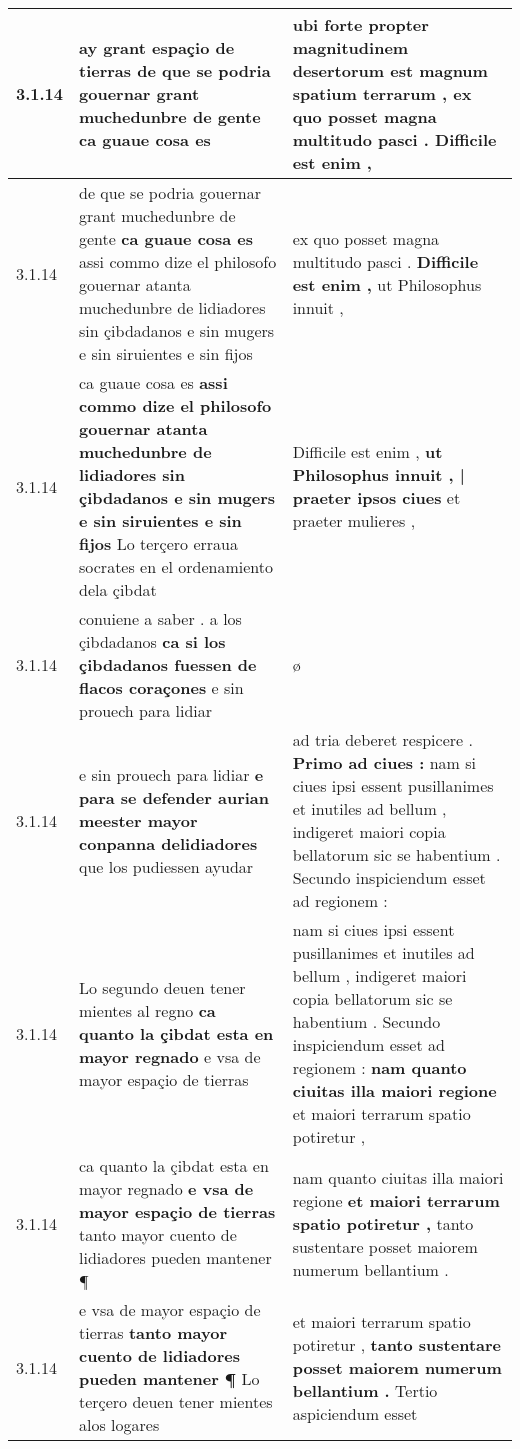 \begin{tabular}{|p{1cm}|p{6.5cm}|p{6.5cm}|}
3.1.14 & ay grant espaçio de tierras \textbf{ de que se podria gouernar grant muchedunbre de gente } ca guaue cosa es & ubi forte propter magnitudinem desertorum est magnum spatium terrarum , \textbf{ ex quo posset magna multitudo pasci . } Difficile est enim , \\\hline
3.1.14 & de que se podria gouernar grant muchedunbre de gente \textbf{ ca guaue cosa es } assi commo dize el philosofo gouernar atanta muchedunbre de lidiadores sin çibdadanos e sin mugers e sin siruientes e sin fijos & ex quo posset magna multitudo pasci . \textbf{ Difficile est enim , } ut Philosophus innuit , \\\hline
3.1.14 & ca guaue cosa es \textbf{ assi commo dize el philosofo gouernar atanta muchedunbre de lidiadores sin çibdadanos e sin mugers e sin siruientes e sin fijos } Lo terçero erraua socrates en el ordenamiento dela çibdat & Difficile est enim , \textbf{ ut Philosophus innuit , | praeter ipsos ciues } et praeter mulieres , \\\hline
3.1.14 & conuiene a saber . a los çibdadanos \textbf{ ca si los çibdadanos fuessen de flacos coraçones } e sin prouech para lidiar & ø \\\hline
3.1.14 & e sin prouech para lidiar \textbf{ e para se defender aurian meester mayor conpanna delidiadores } que los pudiessen ayudar & ad tria deberet respicere . \textbf{ Primo ad ciues : } nam si ciues ipsi essent pusillanimes et inutiles ad bellum , indigeret maiori copia bellatorum sic se habentium . Secundo inspiciendum esset ad regionem : \\\hline
3.1.14 & Lo segundo deuen tener mientes al regno \textbf{ ca quanto la çibdat esta en mayor regnado } e vsa de mayor espaçio de tierras & nam si ciues ipsi essent pusillanimes et inutiles ad bellum , indigeret maiori copia bellatorum sic se habentium . Secundo inspiciendum esset ad regionem : \textbf{ nam quanto ciuitas illa maiori regione } et maiori terrarum spatio potiretur , \\\hline
3.1.14 & ca quanto la çibdat esta en mayor regnado \textbf{ e vsa de mayor espaçio de tierras } tanto mayor cuento de lidiadores pueden mantener ¶ & nam quanto ciuitas illa maiori regione \textbf{ et maiori terrarum spatio potiretur , } tanto sustentare posset maiorem numerum bellantium . \\\hline
3.1.14 & e vsa de mayor espaçio de tierras \textbf{ tanto mayor cuento de lidiadores pueden mantener ¶ } Lo terçero deuen tener mientes alos logares & et maiori terrarum spatio potiretur , \textbf{ tanto sustentare posset maiorem numerum bellantium . } Tertio aspiciendum esset \\\hline

\end{tabular}
